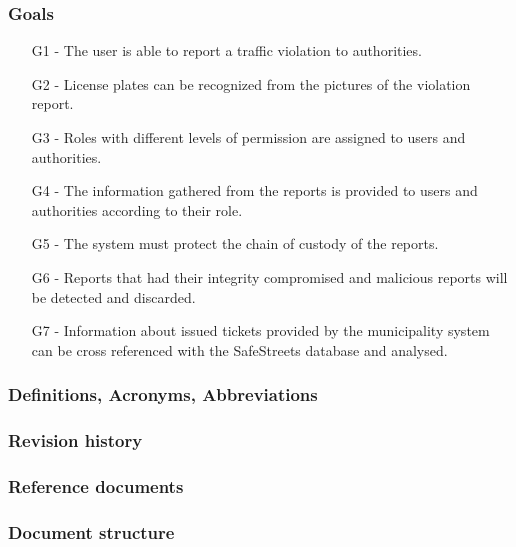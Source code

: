 \subsubsection{Goals}
\begin{itemize}
\item
[G1] - The user is able to report a traffic violation to authorities.
\item
[G2] - License plates can be recognized from the pictures of the violation report.
\item
[G3] - Roles with different levels of permission are assigned to users and authorities.
\item
[G4] - The information gathered from the reports is provided to users and authorities according to their role.
\item
[G5] - The system must protect the chain of custody of the reports. 
\item
[G6] - Reports that had their integrity compromised and malicious reports will be detected and discarded.
\item
[G7] - Information about issued tickets provided by the municipality system can be cross referenced with the SafeStreets database and analysed.
\end{itemize}

\subsubsection{Definitions, Acronyms, Abbreviations}
\subsubsection{Revision history}
\subsubsection{Reference documents}
\subsubsection{Document structure}